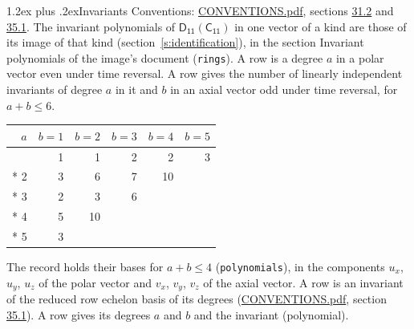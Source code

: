 \documentclass[10pt,a4paper]{article}
\makeatletter
\renewcommand\section{\@startsection{section}{1}{\z@}{-3ex plus -1ex minus -.2ex}%
  {1.2ex plus .2ex}{\normalfont\large\sffamily\bfseries\color{parttitle}}}
\numberwithin{equation}{section}
\newcommand{\grp}[1]{\mathsf{#1}}
\makeatother
\begin{document}
\section{Invariants}\label{s:invariants}
Conventions: \href{../../CONVENTIONS.pdf}{CONVENTIONS.pdf}, sections \href{../../CONVENTIONS.pdf\#conv.31.2}{31.2} and \href{../../CONVENTIONS.pdf\#conv.35.1}{35.1}.
The invariant polynomials of $\grp{D_{11}}(\grp{C_{11}})$ in one vector of a kind are those of its image of that kind (section~\ref{s:identification}), in the section Invariant polynomials of the image's document (\texttt{rings}).
\leavevmode\label{n:index.degree.polar}\label{n:index.degree.axial}A row is a degree $a$ in a polar vector even under time reversal. A row gives the number of linearly independent invariants of degree $a$ in it and $b$ in an axial vector odd under time reversal, for $a + b \le 6$.
{\small\begin{longtable}{@{}rrrrrr@{}}\toprule
$a$ & $b = 1$ & $b = 2$ & $b = 3$ & $b = 4$ & $b = 5$\\\midrule\endhead
\bottomrule\endfoot\endlastfoot
1 & 1 & 1 & 2 & 2 & 3\\*
2 & 3 & 6 & 7 & 10 & \\*
3 & 2 & 3 & 6 &  & \\*
4 & 5 & 10 &  &  & \\*
5 & 3 &  &  &  & \\
\bottomrule\end{longtable}}
\leavevmode\label{n:local.component.polar}\label{n:local.component.axial}The record holds their bases for $a + b \le 4$ (\texttt{polynomials}), in the components $u_{x}$, $u_{y}$, $u_{z}$ of the polar vector and $v_{x}$, $v_{y}$, $v_{z}$ of the axial vector. \label{n:head.polynomial}A row is an invariant of the reduced row echelon basis of its degrees (\href{../../CONVENTIONS.pdf}{CONVENTIONS.pdf}, section \href{../../CONVENTIONS.pdf\#conv.35.1}{35.1}). A row gives its degrees $a$ and $b$ and the invariant (polynomial).
\end{document}
